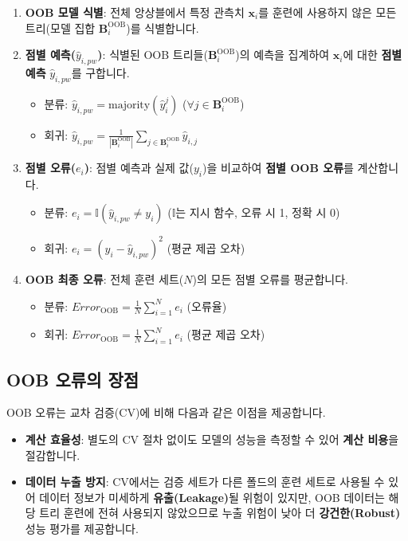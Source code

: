\documentclass[11pt,a4paper]{book}
\theoremstyle{definition}
\begin{document}
\begin{enumerate}
    \item \textbf{OOB 모델 식별}: 전체 앙상블에서 특정 관측치 $\mathbf{x}_i$를 훈련에 사용하지 않은 모든 트리(모델 집합 $\mathbf{B}_{i}^{\text{OOB}}$)를 식별합니다.
    \item \textbf{점별 예측($\hat{y}_{i,pw}$)}: 식별된 OOB 트리들($\mathbf{B}_{i}^{\text{OOB}}$)의 예측을 집계하여 $\mathbf{x}_i$에 대한 \textbf{점별 예측} $\hat{y}_{i,pw}$를 구합니다.
    \begin{itemize}
        \item 분류: $\hat{y}_{i,pw} = \text{majority}(\hat{y}_{i}^{j})$ ($\forall j \in \mathbf{B}_{i}^{\text{OOB}}$)
        \item 회귀: $\hat{y}_{i,pw} = \frac{1}{|\mathbf{B}_{i}^{\text{OOB}}|}\sum_{j \in \mathbf{B}_{i}^{\text{OOB}}}\hat{y}_{i,j}$
    \end{itemize}
    \item \textbf{점별 오류($e_i$)}: 점별 예측과 실제 값($y_i$)을 비교하여 \textbf{점별 OOB 오류}를 계산합니다.
    \begin{itemize}
        \item 분류: $e_{i}=\mathbb{I}(\hat{y}_{i,pw}\ne y_{i})$ ($\mathbb{I}$는 지시 함수, 오류 시 1, 정확 시 0)
        \item 회귀: $e_{i}=(y_{i}-\hat{y}_{i,pw})^{2}$ (평균 제곱 오차)
    \end{itemize}
    \item \textbf{OOB 최종 오류}: 전체 훈련 세트($N$)의 모든 점별 오류를 평균합니다.
    \begin{itemize}
        \item 분류: $Error_{\text{OOB}}=\frac{1}{N}\sum_{i=1}^{N}e_{i}$ (오류율)
        \item 회귀: $Error_{\text{OOB}}=\frac{1}{N}\sum_{i=1}^{N}e_{i}$ (평균 제곱 오차)
    \end{itemize}
\end{enumerate}

\subsection{OOB 오류의 장점}

OOB 오류는 교차 검증(CV)에 비해 다음과 같은 이점을 제공합니다.

\begin{itemize}
    \item \textbf{계산 효율성}: 별도의 CV 절차 없이도 모델의 성능을 측정할 수 있어 \textbf{계산 비용}을 절감합니다.
    \item \textbf{데이터 누출 방지}: CV에서는 검증 세트가 다른 폴드의 훈련 세트로 사용될 수 있어 데이터 정보가 미세하게 \textbf{유출(Leakage)}될 위험이 있지만, OOB 데이터는 해당 트리 훈련에 전혀 사용되지 않았으므로 누출 위험이 낮아 더 \textbf{강건한(Robust)} 성능 평가를 제공합니다.
\end{itemize}
\end{document}
